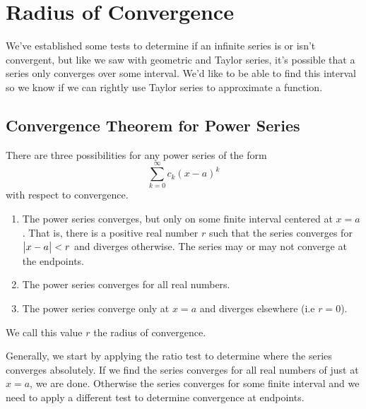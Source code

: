 \section{Radius of Convergence}
We've established some tests to determine if an infinite series is or isn't convergent, but like we saw with geometric and Taylor series, it's possible that a series only converges over some interval.
We'd like to be able to find this interval so we know if we can rightly use Taylor series to approximate a function.

\subsection{Convergence Theorem for Power Series}
\begin{theorem}
	There are three possibilities for any power series of the form
	\begin{equation*}
		\sum_{k=0}^{\infty}{c_k(x-a)^k}
	\end{equation*}
	with respect to convergence.
	\begin{enumerate}
		\item The power series converges, but only on some finite interval centered at $x=a$.
			That is, there is a positive real number $r$ such that the series converges for $\big\lvert x-a \big\rvert<r$ and diverges otherwise.
			The series may or may not converge at the endpoints.
		\item The power series converges for all real numbers.
		\item The power series converge only at $x=a$ and diverges elsewhere (i.e $r=0$).
	\end{enumerate}
	We call this value $r$ the radius of convergence.
\end{theorem}

Generally, we start by applying the ratio test to determine where the series converges absolutely.
If we find the series converges for all real numbers of just at $x=a$, we are done.
Otherwise the series converges for some finite interval and we need to apply a different test to determine convergence at endpoints.

